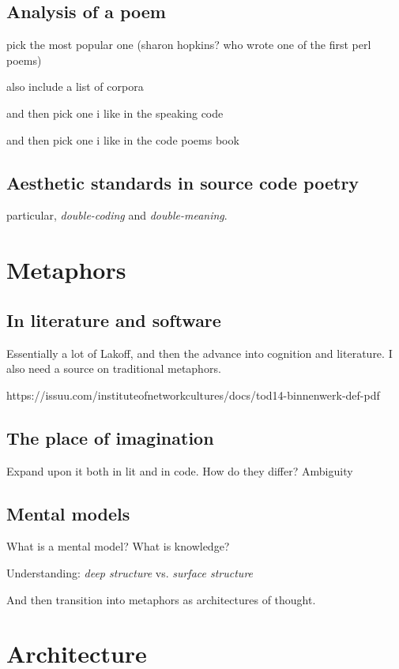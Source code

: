 \documentclass{article}
\begin{document}
\subsection{Analysis of a poem}

pick the most popular one (sharon hopkins? who wrote one of the first perl poems)

also include a list of corpora

and then pick one i like in the speaking code

and then pick one i like in the code poems book

\subsection{Aesthetic standards in source code poetry}

particular, \emph{double-coding} and \emph{double-meaning}.

\section{Metaphors}

\subsection{In literature and software}

Essentially a lot of Lakoff, and then the advance into cognition and literature. I also need a source on traditional metaphors.

https://issuu.com/instituteofnetworkcultures/docs/tod14-binnenwerk-def-pdf

\subsection{The place of imagination}

Expand upon it both in lit and in code. How do they differ? Ambiguity

\subsection{Mental models}

What is a mental model? What is knowledge?

Understanding: \emph{deep structure} vs. \emph{surface structure}

And then transition into metaphors as architectures of thought.

\section{Architecture}
\end{document}
